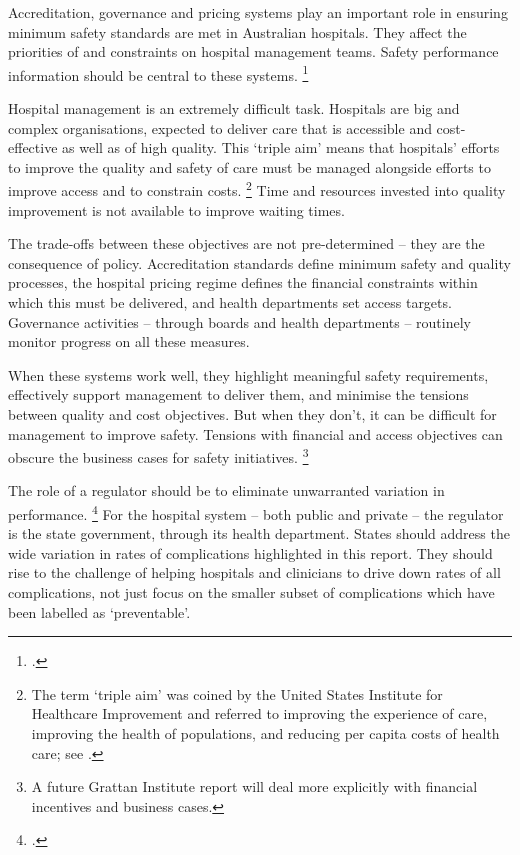 \documentclass[FrontPage]{grattan}
\begin{document}
Accreditation, governance and pricing systems play an important role in ensuring minimum safety standards are met in Australian hospitals.
They affect the priorities of and constraints on hospital management teams.
Safety performance information should be central to these systems.%
	\footcite{Levesquee014825}

Hospital management is an extremely difficult task.
Hospitals are big and complex organisations, expected to deliver care that is accessible and cost-effective as well as of high quality.
This `triple aim' means that hospitals' efforts to improve the quality and safety of care must be managed alongside efforts to improve access and to constrain costs.%
	\footnote{The term `triple aim' was coined by the United States Institute for Healthcare Improvement and referred to improving the experience of care, improving the health of populations, and reducing per capita costs of health care; see \textcite{Berwick_2008}.}
Time and resources invested into quality improvement is not available to improve waiting times.

The trade-offs between these objectives are not pre-determined -- they are the consequence of policy.
Accreditation standards define minimum safety and quality processes, the hospital pricing regime defines the financial constraints within which this must be delivered, and health departments set access targets.
Governance activities -- through boards and health departments -- routinely monitor progress on all these measures.

When these systems work well, they highlight meaningful safety requirements, effectively support management to deliver them, and minimise the tensions between quality and cost objectives.
But when they don't, it can be difficult for management to improve safety.
Tensions with financial and access objectives can obscure the business cases for safety initiatives.%
	\footnote{A future Grattan Institute report will deal more explicitly with financial incentives and business cases.}

The role of a regulator should be to eliminate unwarranted variation in performance.%
	\footcite{Hollnagel-2014-Safety-Management}
For the hospital system -- both public and private -- the regulator is the state government, through its health department.
States should address the wide variation in rates of complications highlighted in this report.
They should rise to the challenge of helping hospitals and clinicians to drive down rates of all complications, not just focus on the smaller subset of complications which have been labelled as `preventable'.
\end{document}
